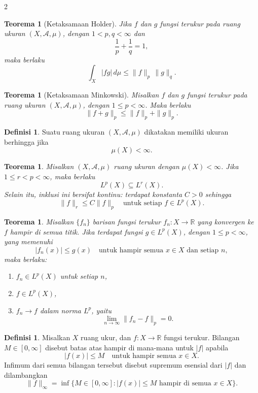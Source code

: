 \documentclass[a4paper,extrafontsizes, 9pt]{memoir}
\theoremstyle{definition}
\newtheorem{definisi}[kalstok]{Definisi}
\theoremstyle{plain}
\newtheorem{teorema}[kalstok]{Teorema}
\theoremstyle{remark}
\begin{document}
\begin{multicols}{2}
  \begin{teorema}[Ketaksamaan Holder]
    Jika $f$ dan $g$ fungsi terukur pada ruang ukuran $(X,\mathcal{A},\mu)$,
    dengan $1<p,q<\infty$ dan
    \[\frac{1}{p}+\frac{1}{q}=1,\]
    maka berlaku
    \[\int_X |fg|\,d\mu\le\|f\|_p\,\|g\|_q.\]
  \end{teorema}

  \begin{teorema}[Ketaksamaan Minkowski]
    Misalkan $f$ dan $g$ fungsi terukur pada ruang ukuran $(X,\mathcal{A},\mu)$, dengan $1\le p<\infty$.
    Maka berlaku
    \[\|f+g\|_p\le\|f\|_p+\|g\|_p.\]
  \end{teorema}

  \begin{definisi}
    Suatu ruang ukuran $(X,\mathcal{A},\mu)$ dikatakan memiliki ukuran berhingga jika
    \[\mu(X)<\infty.\]
  \end{definisi}

  \begin{teorema}
    Misalkan $(X,\mathcal{A},\mu)$ ruang ukuran dengan $\mu(X)<\infty$. Jika $1\le r<p<\infty$, maka berlaku
    \[L^p(X)\subseteq L^r(X).\]
    Selain itu, inklusi ini bersifat kontinu: terdapat konstanta $C>0$ sehingga
    \[\|f\|_r\le C\|f\|_p\quad\text{untuk setiap }f\in L^p(X).\]
  \end{teorema}

  \begin{teorema}
    Misalkan $\{f_n\}$ barisan fungsi terukur $f_n:X\to\mathbb{R}$ yang konvergen ke $f$ hampir di semua titik.
    Jika terdapat fungsi $g\in L^p(X)$, dengan $1\le p<\infty$, yang memenuhi
    \[|f_n(x)|\le g(x)\quad\text{untuk hampir semua }x\in X\text{ dan setiap }n,\]
    maka berlaku:
    \begin{enumerate}[leftmargin=*, itemsep=0.5mm]
      \item $f_n\in L^p(X)$ untuk setiap $n$,
      \item $f\in L^p(X)$,
      \item $f_n\to f$ dalam norma $L^p$, yaitu
            \[\lim_{n\to\infty}\|f_n-f\|_p=0.\]
    \end{enumerate}
  \end{teorema}

  \begin{definisi}
    Misalkan $X$ ruang ukur, dan $f:X\to\mathbb{R}$ fungsi terukur.
    Bilangan $M\in[0,\infty]$ disebut batas atas hampir di mana-mana untuk $|f|$ apabila
    \[|f(x)|\le M\quad\text{untuk hampir semua }x\in X.\]
    Infimum dari semua bilangan tersebut disebut supremum esensial dari $|f|$ dan dilambangkan
    \[\|f\|_{\infty}=\inf\{M\in[0,\infty]:|f(x)|\le M\text{ hampir di semua }x\in X\}.\]
  \end{definisi}


\end{multicols}
\end{document}
